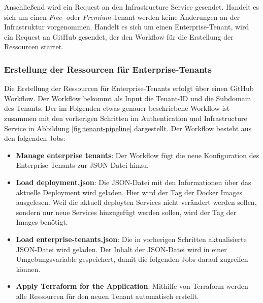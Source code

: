 Anschließend wird ein Request an den Infrastructure Service gesendet.
Handelt es sich um einen \textit{Free}- oder \textit{Premium}-Tenant werden keine Änderungen an der Infrastruktur vorgenommen.
Handelt es sich um einen Enterprise-Tenant, wird ein Request an GitHub gesendet, der
den Workflow für die Erstellung der Ressourcen startet.

\subsubsection{Erstellung der Ressourcen für Enterprise-Tenants}

Die Erstellung der Ressourcen für Enterprise-Tenants erfolgt über einen GitHub Workflow.
Der Workflow bekommt als Input die Tenant-ID und die Subdomain des Tenants.
Der im Folgenden etwas genauer beschriebene Workflow ist zusammen mit den vorherigen Schritten im
Authentication und Infrastructure Service in Abbildung \ref{fig:tenant-pipeline} dargestellt.
Der Workflow besteht aus den folgenden Jobs:
\begin{itemize}
  \item \textbf{Manage enterprise tenants}: Der Workflow fügt die neue Konfiguration des Enterprise-Tenants zur JSON-Datei hinzu.
  \item \textbf{Load deployment.json}: Die JSON-Datei mit den Informationen über das aktuelle Deployment wird geladen. Hier wird der
  Tag der Docker Images ausgelesen. Weil die aktuell deployten Services nicht verändert werden sollen, sondern nur neue Services 
  hinzugefügt werden sollen, wird der Tag der Images benötigt.
  \item \textbf{Load enterprise-tenants.json}: Die in vorherigen Schritten aktualisierte JSON-Datei wird geladen. Der Inhalt der JSON-Datei
  wird in einer Umgebungsvariable gespeichert, damit die folgenden Jobs darauf zugreifen können.
  \item \textbf{Apply Terraform for the Application}: Mithilfe von Terraform werden alle Ressourcen für den neuen Tenant automatisch erstellt.
\end{itemize}

